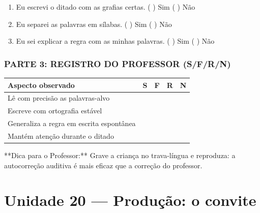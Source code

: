 \begin{exercicio}
\begin{enumerate}[label=\alph*)]
  \item Eu escrevi o ditado com as grafias certas.  \quad ( ) Sim   ( ) Não

  \item Eu separei as palavras em sílabas.  \quad ( ) Sim   ( ) Não

  \item Eu sei explicar a regra com as minhas palavras.  \quad ( ) Sim   ( ) Não

\end{enumerate}

\subsection*{PARTE 3: REGISTRO DO PROFESSOR (S/F/R/N)}

\begin{center}
\renewcommand{\arraystretch}{1.4}
\begin{tabular}{@{}p{9cm}cccc@{}}
\toprule
Aspecto observado & S & F & R & N \\
\midrule
Lê com precisão as palavras-alvo & & & & \\
Escreve com ortografia estável & & & & \\
Generaliza a regra em escrita espontânea & & & & \\
Mantém atenção durante o ditado & & & & \\
\bottomrule\end{tabular}\end{center}

\end{exercicio}

\begin{dica}
**Dica para o Professor:** Grave a criança no trava-língua e reproduza: a autocorreção auditiva é mais eficaz que a correção do professor.
\end{dica}


\chapter{Unidade 20 --- Produção: o convite}


